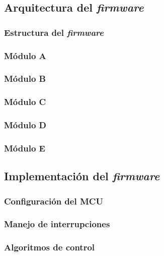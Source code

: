 \subsection{Arquitectura del \textit{firmware}}

\subsubsection{Estructura del \textit{firmware}}
\subsubsection{Módulo A}
\subsubsection{Módulo B}
\subsubsection{Módulo C}
\subsubsection{Módulo D}
\subsubsection{Módulo E}


\subsection{Implementación del \textit{firmware}}

\subsubsection{Configuración del MCU}
\subsubsection{Manejo de interrupciones}
\subsubsection{Algoritmos de control}





